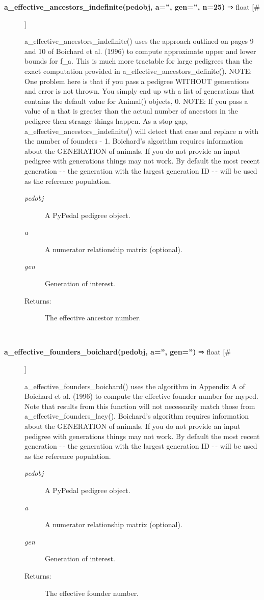 \begin{description}
\item[\textbf{a\_effective\_ancestors\_indefinite(pedobj, a='', gen='', n=25)} ⇒ float [\#]
]
\par a\_effective\_ancestors\_indefinite() uses the approach outlined on pages 9 and 10 of
Boichard et al. (1996) to compute approximate upper and lower bounds for f\_a.  This
is much more tractable for large pedigrees than the exact computation provided in
a\_effective\_ancestors\_definite().
NOTE: One problem here is that if you pass a pedigree WITHOUT generations and error
is not thrown.  You simply end up wth a list of generations that contains the default
value for Animal() objects, 0.
NOTE: If you pass a value of n that is greater than the actual number of ancestors in
the pedigree then strange things happen.  As a stop-gap, a\_effective\_ancestors\_indefinite()
will detect that case and replace n with the number of founders - 1.
Boichard's algorithm requires information about the GENERATION of animals.  If you
do not provide an input pedigree with generations things may not work.  By default
the most recent generation -$\,$- the generation with the largest generation ID -$\,$- will
be used as the reference population.
\begin{description}
\item[\textit{pedobj}
]
A PyPedal pedigree object.
\item[\textit{a}
]
A numerator relationship matrix (optional).
\item[\textit{gen}
]
Generation of interest.
\item[Returns:
]
The effective ancestor number.
\end{description}\\

\item[\textbf{a\_effective\_founders\_boichard(pedobj, a='', gen='')} ⇒ float [\#]
]
\par a\_effective\_founders\_boichard() uses the algorithm in Appendix A of Boichard et al.
(1996) to compute the effective founder number for myped.  Note that results from
this function will not necessarily match those from a\_effective\_founders\_lacy().
Boichard's algorithm requires information about the GENERATION of animals.  If you
do not provide an input pedigree with generations things may not work.  By default
the most recent generation -$\,$- the generation with the largest generation ID -$\,$- will
be used as the reference population.
\begin{description}
\item[\textit{pedobj}
]
A PyPedal pedigree object.
\item[\textit{a}
]
A numerator relationship matrix (optional).
\item[\textit{gen}
]
Generation of interest.
\item[Returns:
]
The effective founder number.
\end{description}\\


\end{description}
